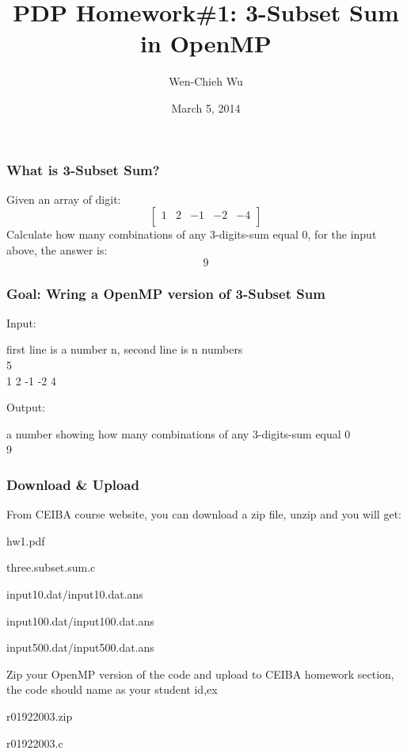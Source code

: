 \documentclass{beamer}
\title{PDP Homework\#1: 3-Subset Sum in OpenMP}
\author{Wen-Chieh Wu}
\date{March 5, 2014}
\begin{document}
\maketitle
\begin{frame}
\frametitle{What is 3-Subset Sum?}
Given an array of digit:
\[
\begin{bmatrix}
  1&2&-1&-2&-4\\
\end{bmatrix}
\]
Calculate how many combinations of any 3-digits-sum equal 0, for the input above, the answer is:
$$
9
$$
\end{frame}
\begin{frame}
\frametitle{Goal: Wring a OpenMP version of 3-Subset Sum}
\begin{itemize}
{\item Input:} first line is a number n, second line is n numbers\\
5\\
1 2 -1 -2 4\\
{\item Output:} a number showing how many combinations of any 3-digits-sum equal 0\\
9
\end{itemize}
\end{frame}

\begin{frame}
\frametitle{Download \& Upload}
From CEIBA course website, you can download a zip file, unzip and you will get:
\begin{itemize}
{\item hw1.pdf}
{\item three.subset.sum.c}
{\item input10.dat/input10.dat.ans}
{\item input100.dat/input100.dat.ans}
{\item input500.dat/input500.dat.ans}
\end{itemize}
Zip your OpenMP version of the code and upload to CEIBA homework section, the code should name as your student id,ex
\begin{itemize}
{\item r01922003.zip}
\begin{itemize}
{\item r01922003.c}
\end{itemize}
\end{itemize}

\end{frame}
\end{document}
